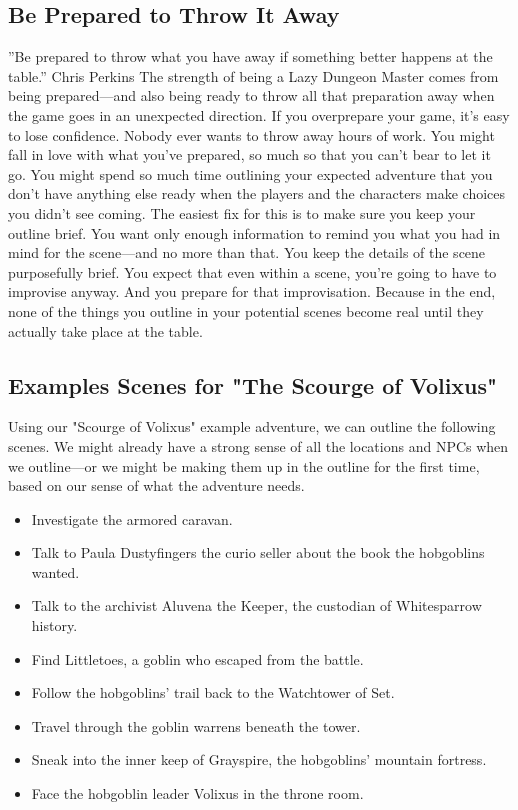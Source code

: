 \documentclass[10pt,a4paper,twoside,bg=print,twocolumn,openany,nodeprecatedcode]{dndbook}
\begin{document}
\subsection{Be Prepared to Throw It Away}
\DndQuote%
{}
{''Be prepared to throw what you have away if something better happens at the table.''}
{Chris Perkins}
The strength of being a Lazy Dungeon Master comes from being prepared—and also being ready to throw all that preparation away when the game goes in an unexpected direction. If you overprepare your game, it's easy to lose confidence. Nobody ever wants to throw away hours of work. You might fall in love with what you've prepared, so much so that you can't bear to let it go. You might spend so much time outlining your expected adventure that you don't have anything else ready when the players and the characters make choices you didn't see coming.
The easiest fix for this is to make sure you keep your outline brief. You want only enough information to remind you what you had in mind for the scene—and no more than that. You keep the details of the scene purposefully brief. You expect that even within a scene, you're going to have to improvise anyway. And you prepare for that improvisation.
Because in the end, none of the things you outline in your potential scenes become real until they actually take place at the table.
\subsection{Examples Scenes for "The Scourge of Volixus"}
Using our "Scourge of Volixus" example adventure, we can outline the following scenes. We might already have a strong sense of all the locations and NPCs when we outline—or we might be making them up in the outline for the first time, based on our sense of what the adventure needs.

\begin{itemize}
\item Investigate the armored caravan.
\item Talk to Paula Dustyfingers the curio seller about the book the hobgoblins wanted.
\item Talk to the archivist Aluvena the Keeper, the custodian of Whitesparrow history.
\item Find Littletoes, a goblin who escaped from the battle.
\item Follow the hobgoblins' trail back to the Watchtower of Set.
\item Travel through the goblin warrens beneath the tower.
\item Sneak into the inner keep of Grayspire, the hobgoblins' mountain fortress.
\item Face the hobgoblin leader Volixus in the throne room.
\end{itemize}
\end{document}
